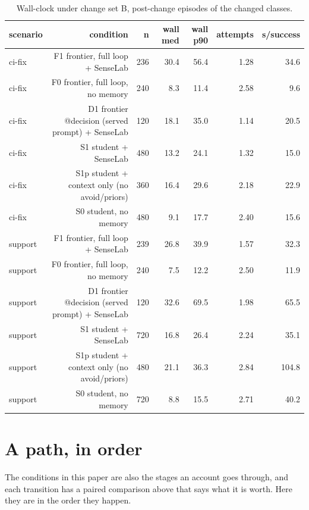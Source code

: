 \documentclass[11pt]{article}
\begin{document}
\begin{table}[H]
\centering\scriptsize
\begin{tabular}{lrrrrrr}
\toprule
\textbf{scenario} & \textbf{condition} & \textbf{n} & \textbf{wall med} & \textbf{wall p90} & \textbf{attempts} & \textbf{s/success} \\
\midrule
ci-fix & F1 frontier, full loop + SenseLab & 236 & 30.4 & 56.4 & 1.28 & 34.6 \\
ci-fix & F0 frontier, full loop, no memory & 240 & 8.3 & 11.4 & 2.58 & 9.6 \\
ci-fix & D1 frontier @decision (served prompt) + SenseLab & 120 & 18.1 & 35.0 & 1.14 & 20.5 \\
ci-fix & S1 student + SenseLab & 480 & 13.2 & 24.1 & 1.32 & 15.0 \\
ci-fix & S1p student + context only (no avoid/priors) & 360 & 16.4 & 29.6 & 2.18 & 22.9 \\
ci-fix & S0 student, no memory & 480 & 9.1 & 17.7 & 2.40 & 15.6 \\
support & F1 frontier, full loop + SenseLab & 239 & 26.8 & 39.9 & 1.57 & 32.3 \\
support & F0 frontier, full loop, no memory & 240 & 7.5 & 12.2 & 2.50 & 11.9 \\
support & D1 frontier @decision (served prompt) + SenseLab & 120 & 32.6 & 69.5 & 1.98 & 65.5 \\
support & S1 student + SenseLab & 720 & 16.8 & 26.4 & 2.24 & 35.1 \\
support & S1p student + context only (no avoid/priors) & 480 & 21.1 & 36.3 & 2.84 & 104.8 \\
support & S0 student, no memory & 720 & 8.8 & 15.5 & 2.71 & 40.2 \\
\bottomrule
\end{tabular}
\caption{Wall-clock under change set B, post-change episodes of the changed classes.}
\label{tab:lat-b}
\end{table}


\section{A path, in order}
\label{sec:path}

The conditions in this paper are also the stages an account goes through, and each
transition has a paired comparison above that says what it is worth. Here they are in the
order they happen.
\end{document}

